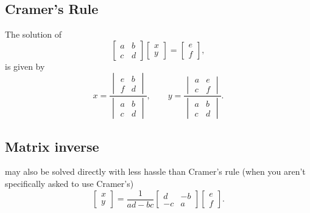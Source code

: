 \documentclass[letterpaper]{scrartcl}
\newcommand{\inv}[1]{\frac{1}{#1}}
\begin{document}
\subsection*{Cramer's Rule}
The solution of
\begin{equation}\label{eqn:karlCircuitsCheatSheet:380}
\begin{bmatrix}
a & b \\
c & d
\end{bmatrix}
\begin{bmatrix}
x \\
y
\end{bmatrix}
=
\begin{bmatrix}
e \\
f
\end{bmatrix},
\end{equation}
is given by
\begin{equation}\label{eqn:karlCircuitsCheatSheet:100}
x = \frac{
   \begin{vmatrix}
   e & b \\
   f & d
   \end{vmatrix}
}{
   \begin{vmatrix}
   a & b \\
   c & d
   \end{vmatrix}
},
\qquad
y = \frac{
   \begin{vmatrix}
   a & e \\
   c & f
   \end{vmatrix}
}{
   \begin{vmatrix}
   a & b \\
   c & d
   \end{vmatrix}
}.
\end{equation}
\subsection*{Matrix inverse}
 may also be solved directly with less hassle than Cramer's rule (when you aren't specifically asked to use Cramer's)
\begin{equation}\label{eqn:karlCircuitsCheatSheet:420}
\begin{bmatrix}
x \\
y
\end{bmatrix}
=
\inv{a d - b c}
\begin{bmatrix}
d  & -b \\
-c & a
\end{bmatrix}
\begin{bmatrix}
e \\
f
\end{bmatrix}.
\end{equation}
\end{document}

